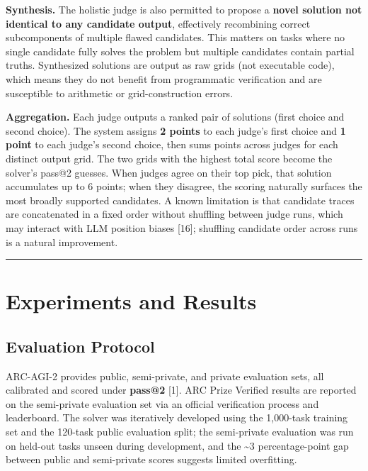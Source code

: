 \documentclass[conference]{IEEEtran}
\begin{document}
\textbf{Synthesis.} The holistic judge is also permitted to propose a
\textbf{novel solution not identical to any candidate output},
effectively recombining correct subcomponents of multiple flawed
candidates. This matters on tasks where no single candidate fully solves
the problem but multiple candidates contain partial truths. Synthesized
solutions are output as raw grids (not executable code), which means
they do not benefit from programmatic verification and are susceptible
to arithmetic or grid-construction errors.

\textbf{Aggregation.} Each judge outputs a ranked pair of solutions
(first choice and second choice). The system assigns \textbf{2 points}
to each judge's first choice and \textbf{1 point} to each judge's second
choice, then sums points across judges for each distinct output grid.
The two grids with the highest total score become the solver's pass@2
guesses. When judges agree on their top pick, that solution accumulates
up to 6 points; when they disagree, the scoring naturally surfaces the
most broadly supported candidates. A known limitation is that candidate
traces are concatenated in a fixed order without shuffling between judge
runs, which may interact with LLM position biases {[}16{]}; shuffling
candidate order across runs is a natural improvement.

\begin{center}\rule{0.5\linewidth}{0.5pt}\end{center}

\section{Experiments and Results}\label{experiments-and-results}

\subsection{Evaluation Protocol}\label{evaluation-protocol}

ARC-AGI-2 provides public, semi-private, and private evaluation sets,
all calibrated and scored under \textbf{pass@2} {[}1{]}. ARC Prize
Verified results are reported on the semi-private evaluation set via an
official verification process and leaderboard. The solver was
iteratively developed using the 1,000-task training set and the 120-task
public evaluation split; the semi-private evaluation was run on held-out
tasks unseen during development, and the \textasciitilde3
percentage-point gap between public and semi-private scores suggests
limited overfitting.
\end{document}
